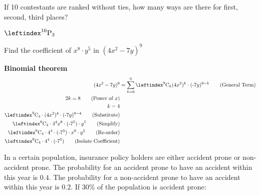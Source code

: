 \documentclass[answers]{exam}
\newcommand{\sz}{\text{-}}
\newcommand{\comb}[2]{\leftindex^{#1}{\text{C}}_{#2}}
\newcommand{\perm}[2]{\leftindex^{#1}{\text{P}}_{#2}}
\begin{document}
\begin{questions}
    \question If 10 contestants are ranked without ties, how many ways are there for first, second, third places?
    \begin{shaded}
        \begin{solutionorbox}
            $\perm{10}{3}$
        \end{solutionorbox}
    \end{shaded}
    \question Find the coefficient of $x^8 \cdot y^5$ in $(4x^2 - 7y)^9$
    \begin{shaded}
        \begin{solutionorbox}
            \textbf{Binomial theorem}
            \begin{align*}
                (4x^2 - 7y)^9 & = \sum_{k = 0}^{9} \comb{9}{k} (4x^2)^k \cdot (\sz7y)^{9-k} \tag{General Term} \\
                2k = 8 \tag{Power of $x$}                                                                      \\
                k = 4 \notag                                                                                   \\
                \comb{9}{4} \cdot (4x^2)^4 \cdot (\sz7y)^{9-4} \tag{Substitute}                                \\
                \comb{9}{4} \cdot 4^4 x^8 \cdot (\sz7^5) \cdot y^5 \tag{Simplify}                              \\
                \comb{9}{4} \cdot 4^4 \cdot (\sz7^5) \cdot x^8 \cdot y^5 \tag{Re-order}                        \\
                \comb{9}{4} \cdot 4^4 \cdot (\sz7^5) \tag{Isolate Coefficient}
            \end{align*}
        \end{solutionorbox}
    \end{shaded}
    \pagebreak
    \question In a certain population, insurance policy holders are either accident prone or non-accident prone. The probability for an accident prone to have an accident within this year is $0.4$. The probability for a non-accident prone to have an accident within this year is $0.2$. If $30\%$ of the population is accident prone:

\end{questions}
\end{document}
